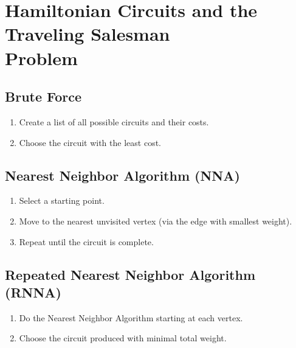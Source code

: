 \section{Hamiltonian Circuits and the Traveling Salesman \\ Problem}%
\label{sec:hamiltonian-circuits}

\subsection{Brute Force}%
\label{sub:brute-force}

\begin{algorithm}
  \begin{enumerate}
  \item Create a list of all possible circuits and their costs.
  \item Choose the circuit with the least cost.
  \end{enumerate}
\end{algorithm}

\subsection{Nearest Neighbor Algorithm (NNA)}%
\label{sub:nearest-neighbor}

\begin{algorithm}
  \begin{enumerate}
  \item Select a starting point.
  \item Move to the nearest unvisited vertex (via the edge with
    smallest weight).
  \item Repeat until the circuit is complete.
  \end{enumerate}
\end{algorithm}

\subsection{Repeated Nearest Neighbor Algorithm (RNNA)}%
\label{sub:repeated-nearest-neighbor}

\begin{algorithm}
  \begin{enumerate}
  \item Do the Nearest Neighbor Algorithm starting at each vertex.
  \item Choose the circuit produced with minimal total weight.
  \end{enumerate}
\end{algorithm}

